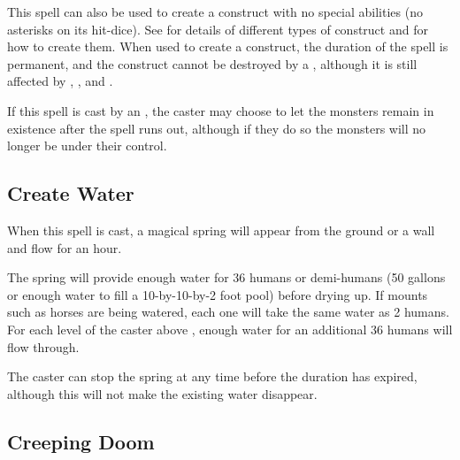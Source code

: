 \begin{multicols*}{2}
This spell can also be used to create a construct with no special abilities (no asterisks on its hit-dice). See  for details of different types of construct and  for how to create them. When used to create a construct, the duration of the spell is permanent, and the construct cannot be destroyed by a , although it is still affected by , , and .

If this spell is cast by an , the caster may choose to let the monsters remain in existence after the spell runs out, although if they do so the monsters will no longer be under their control.

\subsection{Create Water}\label{spell:Create Water}

When this spell is cast, a magical spring will appear from the ground or a wall and flow for an hour.

The spring will provide enough water for 36 humans or demi-humans (50 gallons or enough water to fill a 10-by-10-by-2 foot pool) before drying up. If mounts such as horses are being watered, each one will take the same water as 2 humans. For each level of the caster above , enough water for an additional 36 humans will flow through.

The caster can stop the spring at any time before the duration has expired, although this will not make the existing water disappear.

\subsection{Creeping Doom}\label{spell:Creeping Doom}


\end{multicols*}
